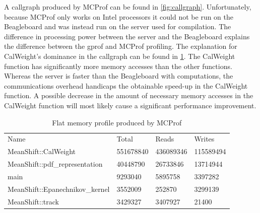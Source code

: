 \documentclass[final]{article}
\begin{document}
A callgraph produced by MCProf can be found in \cref{fig:callgraph}. Unfortunately, because MCProf only works on Intel processors it could not be run on the Beagleboard and was instead run on the server used for compilation. The difference in processing power between the server and the Beagleboard explains the difference between the gprof and MCProf profiling. The explanation for CalWeight's dominance in the callgraph can be found in \cref{tab:memprofile}. The CalWeight function has significantly more memory accesses than the other functions. Whereas the server is faster than the Beagleboard with computations, the communications overhead handicaps the obtainable speed-up in the CalWeight function. A possible decrease in the amount of necessary memory accesses in the CalWeight function will most likely cause a significant performance improvement.

\begin{table}[H]
\centering
\begin{tabular}{llll}
Name & Total & Reads & Writes\\
MeanShift::CalWeight   &  551678840  &   436089346   &  115589494\\
MeanShift::pdf\_representation    &  40448790  &    26733846   &   13714944\\
main   &    9293040   &    5895758    &  3397282\\
MeanShift::Epanechnikov\_kernel    &   3552009       & 252870  &     3299139\\
MeanShift::track   &    3429327   &    3407927      &   21400\\

\end{tabular}
\caption{Flat memory profile produced by MCProf}
\label{tab:memprofile}
\end{table}
\end{document}
